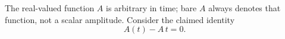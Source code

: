 \documentclass{article}
\begin{document}
The real-valued function $A$ is arbitrary in time; bare $A$ always denotes
that function, not a scalar amplitude.  Consider the claimed
identity
\begin{equation}
A(t)-A\,t=0 .\label{function-not-amplitude}
\end{equation}
\end{document}
